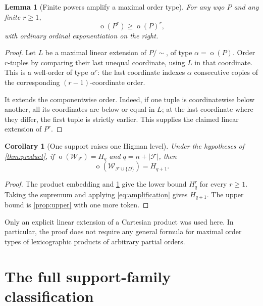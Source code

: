 \documentclass[11pt]{article}
\numberwithin{equation}{section}
\theoremstyle{plain}
\newtheorem{lemma}[lemma]{Lemma}
\newtheorem{corollary}[corollary]{Corollary}
\theoremstyle{definition}
\theoremstyle{remark}
\newcommand{\ot}{\operatorname{o}}
\newcommand{\F}{\mathcal F}
\newcommand{\W}{\mathcal W}
\newcommand{\HH}{H}
\newcommand{\equ}{\sim}
\begin{document}
\begin{lemma}[Finite powers amplify a maximal order type]\label{lem:power}
For any wqo $P$ and any finite $r\geq1$,
\begin{equation}\label{eq:lexlower}
 \ot(P^r)\geq\ot(P)^r,
\end{equation}
with ordinary ordinal exponentiation on the right.
\end{lemma}
\begin{proof}
Let $L$ be a maximal linear extension of $P/{\equ}$, of type $\alpha=\ot(P)$. Order $r$-tuples by comparing their last unequal coordinate, using $L$ in that coordinate. This is a well-order of type $\alpha^r$: the last coordinate indexes $\alpha$ consecutive copies of the corresponding $(r-1)$-coordinate order.

It extends the componentwise order. Indeed, if one tuple is coordinatewise below another, all its coordinates are below or equal in $L$; at the last coordinate where they differ, the first tuple is strictly earlier. This supplies the claimed linear extension of $P^r$.
\end{proof}

\begin{corollary}[One support raises one Higman level]\label{cor:activation}
Under the hypotheses of \cref{thm:product}, if $\ot(\W_{\F})=\HH_q$ and $q=n+|\F|$, then
\[
 \ot(\W_{\F\cup\{D\}})=\HH_{q+1}.
\]
\end{corollary}
\begin{proof}
The product embedding and \cref{lem:power} give the lower bound $\HH_q^r$ for every $r\geq1$. Taking the supremum and applying \eqref{eq:amplification} gives $\HH_{q+1}$. The upper bound is \cref{prop:upper} with one more token.
\end{proof}

Only an explicit linear extension of a Cartesian product was used here. In particular, the proof does not require any general formula for maximal order types of lexicographic products of arbitrary partial orders.

\section{The full support-family classification}\label{sec:classification}
\end{document}
